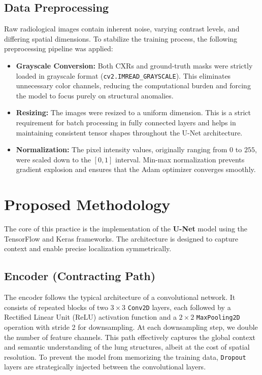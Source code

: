 \documentclass[conference]{IEEEtran}
\begin{document}
\subsection{Data Preprocessing}
Raw radiological images contain inherent noise, varying contrast levels, and differing spatial dimensions. To stabilize the training process, the following preprocessing pipeline was applied:
\begin{itemize}
    \item \textbf{Grayscale Conversion:} Both CXRs and ground-truth masks were strictly loaded in grayscale format (\texttt{cv2.IMREAD\_GRAYSCALE}). This eliminates unnecessary color channels, reducing the computational burden and forcing the model to focus purely on structural anomalies.
    \item \textbf{Resizing:} The images were resized to a uniform dimension. This is a strict requirement for batch processing in fully connected layers and helps in maintaining consistent tensor shapes throughout the U-Net architecture.
    \item \textbf{Normalization:} The pixel intensity values, originally ranging from $0$ to $255$, were scaled down to the $[0, 1]$ interval. Min-max normalization prevents gradient explosion and ensures that the Adam optimizer converges smoothly.
\end{itemize}

\section{Proposed Methodology}
The core of this practice is the implementation of the \textbf{U-Net} model using the TensorFlow and Keras frameworks. The architecture is designed to capture context and enable precise localization symmetrically.

\subsection{Encoder (Contracting Path)}
The encoder follows the typical architecture of a convolutional network. It consists of repeated blocks of two $3 \times 3$ \texttt{Conv2D} layers, each followed by a Rectified Linear Unit (ReLU) activation function and a $2 \times 2$ \texttt{MaxPooling2D} operation with stride 2 for downsampling. At each downsampling step, we double the number of feature channels. This path effectively captures the global context and semantic understanding of the lung structures, albeit at the cost of spatial resolution. To prevent the model from memorizing the training data, \texttt{Dropout} layers are strategically injected between the convolutional layers.
\end{document}
